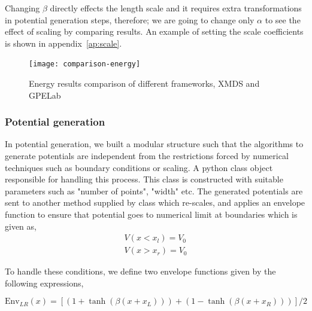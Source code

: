 \documentclass[a4paper,times,hidelinks,12pt]{article}
\begin{document}
Changing $\beta$ directly effects the length scale and it requires extra transformations in potential generation steps, therefore; we are going to change only $\alpha$ to see the effect of scaling by comparing results. An example of setting the scale coefficients is shown in appendix~\ref{ap:scale}.


\graphicspath{{"../figs/numericanalyze/"}}
\begin{figure}[H]
\centering
    \texttt{[image: comparison-energy]}
\caption{Energy results comparison of different frameworks, XMDS and GPELab}
\label{fig:dens_energy_error}
\end{figure}


\subsubsection{Potential generation} \label{sec:potential_generation}

In potential generation, we built a modular structure such that the algorithms to generate potentials are independent from the restrictions forced by numerical techniques such as boundary conditions or scaling. A python class object responsible for handling this process. This class is constructed with suitable parameters such as "number of points", "width" etc. The generated potentials are sent to another method supplied by class which re-scales, and applies an envelope function to ensure that potential goes to numerical limit at boundaries which is given as,
\begin{equation}
\label{eq:potential_boundary_conditions}
\begin{split}
    V(x < x_l) = V_0 \\ 
    V(x > x_r) = V_0
\end{split}
\end{equation}

To handle these conditions, we define two envelope functions given by the following expressions, 

\begin{equation}
\label{eq:envelope_potential_lr}
    \text{Env}_{LR}(x) = [(1 + \tanh{(\beta(x + x_L))}) + (1 - \tanh{(\beta(x + x_R))})]/2
\end{equation}
\end{document}
